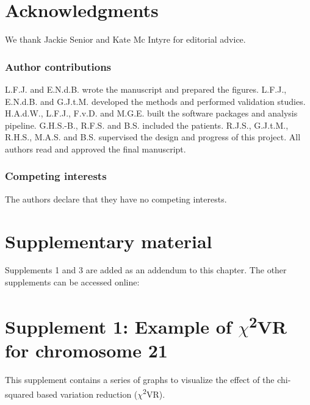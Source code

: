\section*{Acknowledgments}\label{Acknowledgments} 
We thank Jackie Senior and Kate Mc Intyre for editorial advice.

\subsubsection{Author contributions}
L.F.J. and E.N.d.B. wrote the manuscript and prepared the figures. L.F.J., E.N.d.B. and G.J.t.M. developed the methods and performed validation studies. H.A.d.W., L.F.J., F.v.D. and M.G.E. built the software packages and analysis pipeline. G.H.S.-B., R.F.S. and B.S. included the patients. R.J.S., G.J.t.M., R.H.S., M.A.S. and B.S. supervised the design and progress of this project. All authors read and approved the final manuscript.

\subsubsection{Competing interests}
The authors declare that they have no competing interests.

\section*{Supplementary material}\label{Supplementary material}
Supplements 1 and 3 are added as an addendum to this chapter. 
The other supplements can be accessed online: 


\newpage
{}
\section[Supplement 1: $\chi$\textsuperscript{2}VR for chromosome 21]{Supplement 1: Example of $\chi$\textsuperscript{2}VR for chromosome 21}\label{Supplement 1}

This supplement contains a series of graphs to visualize the effect of the chi-squared based variation reduction ($\chi$\textsuperscript{2}VR). 


